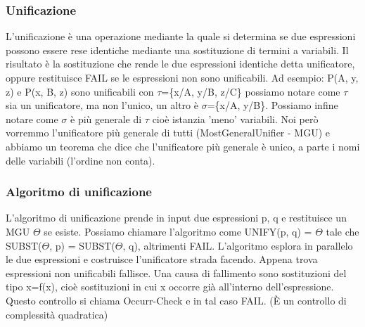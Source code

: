 \documentclass{article}
\begin{document}
\subsubsection{Unificazione}
L'unificazione è una operazione mediante la quale si determina se due espressioni possono essere rese identiche mediante una sostituzione di termini a variabili. Il risultato è la sostituzione che rende le due espressioni identiche detta unificatore, oppure restituisce FAIL se le espressioni non sono unificabili. \newline
Ad esempio: P(A, y, z) e P(x, B, z) sono unificabili con $\tau$=\{x/A, y/B, z/C\} possiamo notare come $\tau$ sia un unificatore, ma non l'unico, un altro è $\sigma$=\{x/A, y/B\}. Possiamo infine notare come $\sigma$ è più generale di $\tau$ cioè istanzia 'meno' variabili. Noi però vorremmo l’unificatore più generale di tutti (MostGeneralUnifier - MGU) e abbiamo un teorema che dice che l’unificatore più generale è unico, a parte i nomi delle variabili (l’ordine non conta).

\subsubsection{Algoritmo di unificazione}
L’algoritmo di unificazione prende in input due espressioni p, q e restituisce un MGU $\Theta$ se esiste. Possiamo chiamare l'algoritmo come UNIFY(p, q) = $\Theta$ tale che SUBST($\Theta$, p) = SUBST($\Theta$, q), altrimenti FAIL. L’algoritmo esplora in parallelo le due espressioni e costruisce l’unificatore strada facendo. Appena trova espressioni non unificabili fallisce. Una causa di fallimento sono sostituzioni del tipo x=f(x), cioè sostituzioni in cui x occorre già all'interno dell'espressione. Questo controllo si chiama Occurr-Check e in tal caso FAIL. (È un controllo di complessità quadratica)
\end{document}
